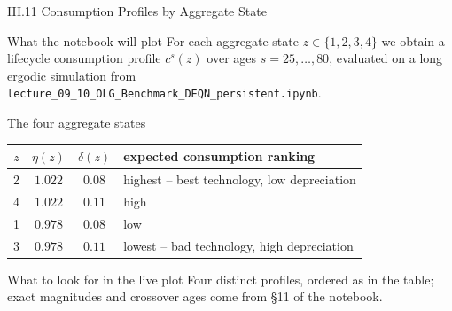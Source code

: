 \documentclass[aspectratio=169,11pt]{beamer}
\newcommand{\emphc}[1]{\textcolor{harvardcrimson}{#1}}
\begin{document}
\begin{frame}{III.11 Consumption Profiles by Aggregate State}
\footnotesize
\begin{block}{What the notebook will plot}
\vspace{-3pt}
For each aggregate state $z \in \{1,2,3,4\}$ we obtain a lifecycle consumption profile $c^s(z)$ over ages $s=25,\ldots,80$, evaluated on a long ergodic simulation from \texttt{lecture\_09\_10\_OLG\_Benchmark\_DEQN\_persistent.ipynb}.
\end{block}

\begin{block}{The four aggregate states}
\vspace{-3pt}
\centering\renewcommand{\arraystretch}{0.95}
\begin{tabular}{cccl}
\toprule
$z$ & $\eta(z)$ & $\delta(z)$ & expected consumption ranking \\
\midrule
2 & $1.022$ & $0.08$ & \emphc{highest} -- best technology, low depreciation \\
4 & $1.022$ & $0.11$ & high \\
1 & $0.978$ & $0.08$ & low \\
3 & $0.978$ & $0.11$ & \emphc{lowest} -- bad technology, high depreciation \\
\bottomrule
\end{tabular}
\end{block}

\begin{alertblock}{What to look for in the live plot}
\vspace{-3pt}
Four distinct profiles, ordered as in the table; exact magnitudes and crossover ages come from \S 11 of the notebook.
\end{alertblock}
\end{frame}
\end{document}
